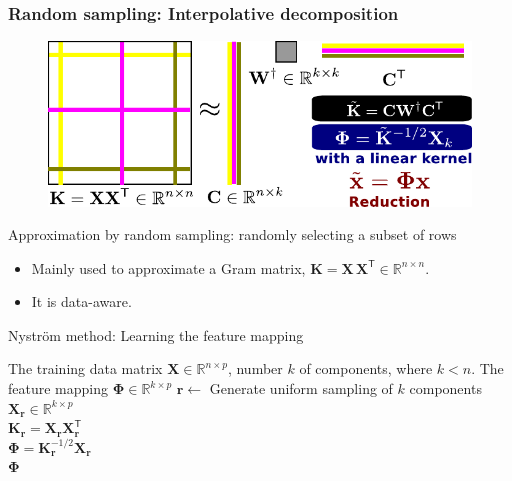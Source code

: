 \documentclass{beamer}
\begin{document}
\begin{frame}

\frametitle{\textbf{Random sampling:} Interpolative decomposition}
\begin{figure}
\centering
\includegraphics[width=0.75\linewidth]{figures/nystroem.pdf}
\end{figure}

Approximation by random sampling: randomly selecting a subset of rows 
\cite{Wang:2013:ICM:2567709.2567748}
\begin{itemize}
    \item Mainly used to approximate a Gram matrix, $\mathbf{K} = 
    \mathbf{X}\,\mathbf{X}^\mathsf{T} \in \mathbb{R}^{n\times n}$.
    \item It is data-aware.
\end{itemize}
\end{frame}

\begin{frame}
\begin{algorithm}[H]
\caption{Nystr\"om method: Learning the feature mapping}
\begin{algorithmic}[1]
\REQUIRE The training data matrix $\mathbf{X} \in \mathbb{R}^{n\times p}$, 
number $k$ of 
components, where $k < n$.
\ENSURE The feature mapping $\mathbf{\Phi} \in \mathbb{R}^{k\times p}$ 
\STATE $\mathbf{r} \leftarrow$ Generate uniform sampling of $k$ components\\
\STATE $\mathbf{X}_{\mathbf{r}} \in \mathbb{R}^{k\times p}$ \\
\STATE $\mathbf{K}_{\mathbf{r}} = \mathbf{X}_\mathbf{r} 
\mathbf{X}_\mathbf{r}^\mathsf{T}$ \\
\STATE $\mathbf{\Phi} = \mathbf{K}_\mathbf{r}^{-1/2} \mathbf{X}_\mathbf{r}$ 
\\
\RETURN $\mathbf{\Phi}$
\end{algorithmic}
\end{algorithm}

\end{frame}
\end{document}
